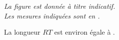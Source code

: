 \begin{methode}    
    \exercice
    
    {\it La figure est donnée à titre indicatif.\\ Les mesures indiquées sont en \Lg{}.}
    
    \vspace*{10mm}
    \correction
    La longueur $RT$ est environ égale à \Lg{\ResultatPytha}.
\end{methode}
